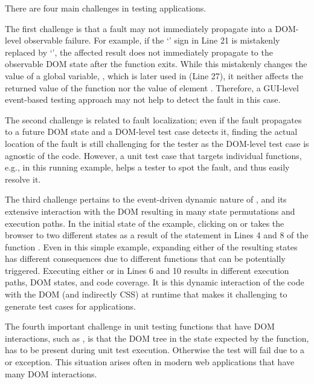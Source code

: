 There are four main challenges in testing \javascript applications. 
 
The first challenge is that a fault may not immediately propagate into a DOM-level observable failure. %
For example, if the `\code{+}' sign in Line 21 is mistakenly replaced by `\code{-}', the affected result does not immediately propagate to the observable DOM state after the function exits. While this mistakenly changes the value of a global variable, , which is 
later used in   (Line 27), it neither affects the returned value of the  function nor the  value of element . Therefore, a GUI-level event-based testing approach may not help to detect the fault in this case.

The second challenge is related to fault localization; even if the fault propagates to a future DOM state and a DOM-level test case detects it, finding the actual location of the fault is still challenging for the tester as the DOM-level test case is agnostic of the \javascript code.
However, a unit test case that targets individual functions, e.g.,  in this running example, helps a tester to spot the fault, and thus easily resolve it. %

The third challenge pertains to the event-driven dynamic nature of \javascript, and its extensive interaction with the DOM  resulting in many state permutations and execution paths. In the initial state of the example, clicking on  or  takes the browser to two different states as a result of the  statement in Lines 4 and 8 of the function . 
Even in this simple example, expanding either of the resulting states has different consequences due to different functions that can be potentially triggered. 
Executing either  or  in Lines 6 and 10 results in different execution paths, DOM states, and code coverage. 
It is this dynamic interaction of the \javascript code with the DOM (and indirectly CSS) at runtime that makes it challenging to generate test cases for \javascript applications.  

The fourth important challenge in unit testing \javascript functions that have DOM interactions, such as , is that the DOM tree in the state expected by the function, has to be present during unit test execution. Otherwise the test will fail due to a  or  exception. This situation arises often in modern web applications that have many DOM interactions.
